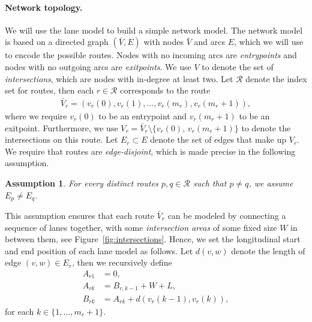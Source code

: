 \documentclass[a4paper]{report}
\theoremstyle{definition}
\theoremstyle{plain}
\newtheorem{assump}{Assumption}[chapter]
\begin{document}
\paragraph{Network topology.}

We will use the lane model to build a simple network model. The network model is
based on a directed graph $(\bar{V},E)$ with nodes $\bar{V}$ and arcs $E$, which
we will use to encode the possible routes.
%
Nodes with no incoming arcs are \textit{entrypoints} and nodes with no outgoing
arcs are \textit{exitpoints}.
%
We use $V$ to denote the set of \textit{intersections}, which are nodes with
in-degree at least two.
%
Let $\mathcal{R}$ denote the index set for routes, then each $r \in \mathcal{R}$
corresponds to the route
\begin{align*}
  \bar{V}_{r} = (v_{r}(0), v_{r}(1), \dots, v_{r}(m_{r}), v_{r}(m_{r}+1)) ,
\end{align*}
%
where we require $v_{r}(0)$ to be an entrypoint and $v_{r}(m_{r}+1)$ to be an
exitpoint. Furthermore, we use
$V_{r} = \bar{V}_{r} \setminus \{ v_{r}(0), \, v_{r}(m_{r}+1) \}$ to denote the
intersections on this route.
%
Let $E_{r} \subset E$ denote the set of edges that make up $V_{r}$.
%
We require that routes are \emph{edge-disjoint}, which is made precise in the
following assumption.

\begin{assump}\label{assump:disjoint-routes}
  For every distinct routes $p,q \in \mathcal{R}$ such that $p \neq q$, we
  assume $E_{p} \neq E_{q}$.
\end{assump}

This assumption ensures that each route $\bar{V}_{r}$ can be modeled by
connecting a sequence of lanes together, with some \emph{intersection areas} of
some fixed size $W$ in between them, see Figure~\ref{fig:intersections}.
%
Hence, we set the longitudinal start and end position of each lane model as
follows. Let $d(v, w)$ denote the length of edge $(v,w) \in E_{r}$, then we
recursively define
\begin{subequations}
\begin{align}
  A_{r1} &= 0 , \\
  A_{rk} &= B_{r,k-1} + W + L , \\
  B_{rk} &= A_{rk} + d(v_{r}(k-1), v_{r}(k)) ,
\end{align}
\end{subequations}
for each $k \in \{1, \dots, m_{r} + 1\}$.
\end{document}
